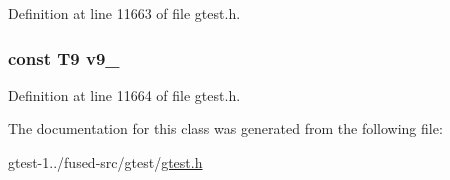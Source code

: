 \-Definition at line 11663 of file gtest.\-h.

\hypertarget{classtesting_1_1internal_1_1ValueArray28_a6356e16cf54a9dfac8525f20242af31e}{
\subsubsection[{v9\-\_\-}]{\setlength{\rightskip}{0pt plus 5cm}const \-T9 {\bf v9\-\_\-}}}\label{d5/d8e/classtesting_1_1internal_1_1ValueArray28_a6356e16cf54a9dfac8525f20242af31e}


\-Definition at line 11664 of file gtest.\-h.



\-The documentation for this class was generated from the following file\-:\begin{DoxyCompactItemize}
\item 
gtest-\/1../fused-\/src/gtest/\hyperlink{fused-src_2gtest_2gtest_8h}{gtest.\-h}\end{DoxyCompactItemize}
